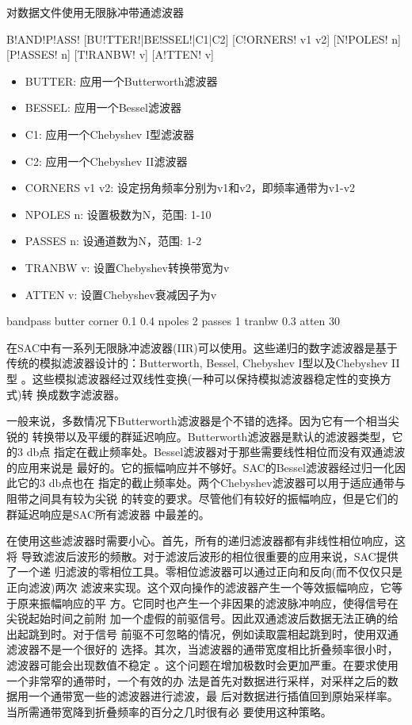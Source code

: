 \label{cmd:bandpass}

对数据文件使用无限脉冲带通滤波器

\begin{SACSTX}
B!AND!P!ASS! [BU!TTER!|BE!SSEL!|C1|C2] [C!ORNERS! v1 v2] [N!POLES! n] [P!ASSES! n] 
    [T!RANBW! v] [A!TTEN! v]
\end{SACSTX}

\begin{itemize}
\item BUTTER: 应用一个Butterworth滤波器
\item BESSEL: 应用一个Bessel滤波器
\item C1: 应用一个Chebyshev I型滤波器
\item C2: 应用一个Chebyshev II滤波器
\item CORNERS v1 v2: 设定拐角频率分别为v1和v2，即频率通带为v1-v2
\item NPOLES n: 设置极数为N，范围: 1-10
\item PASSES n: 设通道数为N，范围: 1-2
\item TRANBW v: 设置Chebyshev转换带宽为v
\item ATTEN v: 设置Chebyshev衰减因子为v
\end{itemize}

\begin{SACDFT}
bandpass butter corner 0.1 0.4 npoles 2 passes 1 tranbw 0.3 atten 30
\end{SACDFT}

在SAC中有一系列无限脉冲滤波器(IIR)可以使用。这些递归的数字滤波器是基于
传统的模拟滤波器设计的：Butterworth, Bessel, Chebyshev I型以及Chebyshev II型
。这些模拟滤波器经过双线性变换(一种可以保持模拟滤波器稳定性的变换方式)转
换成数字滤波器。

一般来说，多数情况下Butterworth滤波器是个不错的选择。因为它有一个相当尖锐的
转换带以及平缓的群延迟响应。Butterworth滤波器是默认的滤波器类型，它的3 db点
指定在截止频率处。Bessel滤波器对于那些需要线性相位而没有双通滤波的应用来说是
最好的。它的振幅响应并不够好。SAC的Bessel滤波器经过归一化因此它的3 db点也在
指定的截止频率处。两个Chebyshev滤波器可以用于适应通带与阻带之间具有较为尖锐
的转变的要求。尽管他们有较好的振幅响应，但是它们的群延迟响应是SAC所有滤波器
中最差的。

在使用这些滤波器时需要小心。首先，所有的递归滤波器都有非线性相位响应，这将
导致滤波后波形的频散。对于滤波后波形的相位很重要的应用来说，SAC提供了一个递
归滤波的零相位工具。零相位滤波器可以通过正向和反向(而不仅仅只是正向滤波)两次
滤波来实现。这个双向操作的滤波器产生一个等效振幅响应，它等于原来振幅响应的平
方。它同时也产生一个非因果的滤波脉冲响应，使得信号在尖锐起始时间之前附
加一个虚假的前驱信号。因此双通滤波后数据无法正确的给出起跳到时。对于信号
前驱不可忽略的情况，例如读取震相起跳到时，使用双通滤波器不是一个很好的
选择。其次，当滤波器的通带宽度相比折叠频率很小时，滤波器可能会出现数值不稳定
。这个问题在增加极数时会更加严重。在要求使用一个非常窄的通带时，一个有效的办
法是首先对数据进行采样，对采样之后的数据用一个通带宽一些的滤波器进行滤波，最
后对数据进行插值回到原始采样率。当所需通带宽降到折叠频率的百分之几时很有必	
要使用这种策略。

